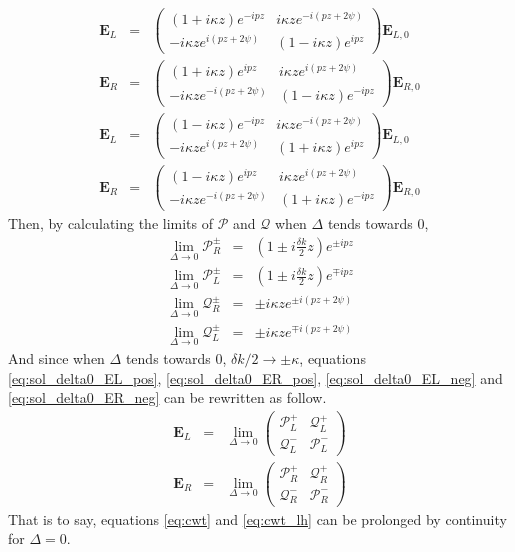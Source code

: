 \begin{eqnarray}
\bm{E}_{L} &=&\begin{pmatrix}
(1 +i\kappa z)e^{-ipz} & i\kappa z e^{-i(pz+2\psi)}\\-i\kappa z e^{i(pz+2\psi)} & (1-i\kappa z)e^{ipz}
\end{pmatrix}\bm{E}_{L,0}\label{eq:sol_delta0_EL_pos}\\
\bm{E}_{R} &=&\begin{pmatrix}
(1 +i\kappa z)e^{ipz} & i\kappa z e^{i(pz+2\psi)}\\-i\kappa z e^{-i(pz+2\psi)} & (1-i\kappa z)e^{-ipz}
\end{pmatrix}\bm{E}_{R,0}\label{eq:sol_delta0_ER_pos}\\
\bm{E}_{L} &=&\begin{pmatrix}
(1 -i\kappa z)e^{-ipz} & i\kappa z e^{-i(pz+2\psi)}\\-i\kappa z e^{i(pz+2\psi)} & (1+i\kappa z)e^{ipz}
\end{pmatrix}\bm{E}_{L,0}\label{eq:sol_delta0_EL_neg}\\
\bm{E}_{R} &=&\begin{pmatrix}
(1 -i\kappa z)e^{ipz} & i\kappa z e^{i(pz+2\psi)}\\-i\kappa z e^{-i(pz+2\psi)} & (1+i\kappa z)e^{-ipz}
\end{pmatrix}\bm{E}_{R,0}\label{eq:sol_delta0_ER_neg}
\end{eqnarray}
%
Then, by calculating the limits of $\mathcal{P}$ and $\mathcal{Q}$ when $\Delta$ tends towards 0,
\begin{eqnarray}
	\lim_{\Delta\rightarrow 0} \mathcal{P}^\pm_R &=&  (1\pm i\frac{\delta k}{2}z)e^{\pm ipz}\\
	\lim_{\Delta\rightarrow 0} \mathcal{P}^\pm_L &=&  (1\pm i\frac{\delta k}{2}z)e^{\mp ipz}\\
	\lim_{\Delta\rightarrow 0} \mathcal{Q}^\pm_R &=&  \pm i\kappa ze^{\pm i(pz+2\psi)}\\
	\lim_{\Delta\rightarrow 0} \mathcal{Q}^\pm_L &=&  \pm i\kappa ze^{\mp i(pz+2\psi)}
\end{eqnarray}
And since when $\Delta$ tends towards 0, $\delta k/2 \rightarrow \pm\kappa$, equations \ref{eq:sol_delta0_EL_pos}, \ref{eq:sol_delta0_ER_pos}, \ref{eq:sol_delta0_EL_neg} and \ref{eq:sol_delta0_ER_neg} can be rewritten as follow.
\begin{eqnarray}
\bm{E}_L &=&\lim_{\Delta\rightarrow 0}\begin{pmatrix}
	\mathcal{P}^+_L & \mathcal{Q}^+_L\\
	\mathcal{Q}^-_L & \mathcal{P}^-_L
\end{pmatrix}\\
\bm{E}_R &=&\lim_{\Delta\rightarrow 0}\begin{pmatrix}
	\mathcal{P}^+_R & \mathcal{Q}^+_R\\
	\mathcal{Q}^-_R & \mathcal{P}^-_R
\end{pmatrix}
\end{eqnarray}
%
That is to say, equations \ref{eq:cwt} and \ref{eq:cwt_lh} can be prolonged by continuity for $\Delta=0$.

